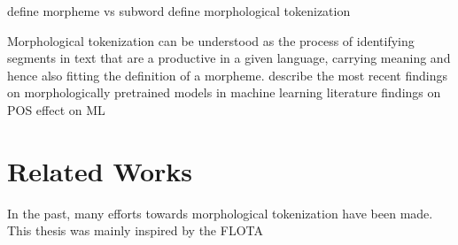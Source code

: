define morpheme vs subword
define morphological tokenization

Morphological tokenization can be understood as the process of identifying segments in text that are a productive in a given language, carrying meaning and hence also fitting the definition of a morpheme.
describe the most recent findings on morphologically pretrained models in machine learning literature
findings on POS effect on ML

\section{Related Works}
\label{sec:related-works}



In the past, many efforts towards morphological tokenization have been made.
This thesis was mainly inspired by the FLOTA


